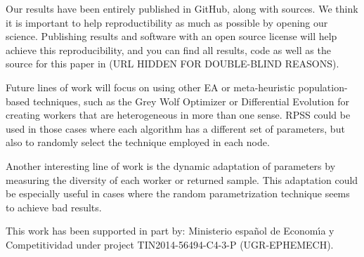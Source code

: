 Our results have been entirely published in GitHub, along with
sources. We think it is important to help reproductibility as much as
possible by opening our science. Publishing results and software with
an open source license will help achieve this reproducibility, and you
can find all results, code as well as the source for this paper in
(URL HIDDEN FOR DOUBLE-BLIND REASONS).

Future lines of work will focus on using other EA or 
meta-heuristic population-based techniques, such as the Grey Wolf Optimizer \cite{mirjalili2014grey}
or Differential Evolution \cite{storn1997differential} for creating workers that are 
heterogeneous in more than one sense. RPSS could be used 
in those cases where each algorithm has a different set of 
parameters, but also to randomly select the technique employed 
in each node.

Another interesting line of work is the dynamic 
adaptation of parameters by measuring the diversity of each 
worker or returned sample. This adaptation could be especially 
useful in cases where the random parametrization technique 
seems to achieve bad results. 

\begin{acks}
This work has been supported in part by:  Ministerio espa\~{n}ol de
Econom\'{\i}a y Competitividad under project TIN2014-56494-C4-3-P
(UGR-EPHEMECH).
\end{acks}
